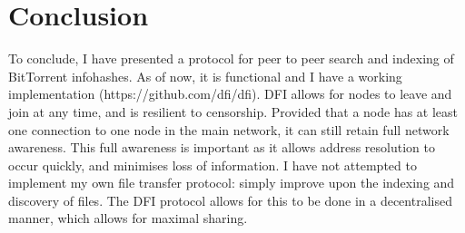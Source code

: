\section{Conclusion}
\begin{multicols}{2}
To conclude, I have presented a protocol for peer to peer search and
indexing of BitTorrent infohashes. As of now, it is functional and I have a
working implementation (https://github.com/dfi/dfi). 
DFI allows for nodes to leave and join at any time, and is resilient to
censorship. Provided that a node has at least one connection to one node in
the main network, it can still retain full network awareness. This full
awareness is important as it allows address resolution to occur quickly, and
minimises loss of information.
I have not attempted to implement my own file transfer protocol: simply improve
upon the indexing and discovery of files. The DFI protocol allows for this to be
done in a decentralised manner, which allows for maximal sharing.
\end{multicols}

